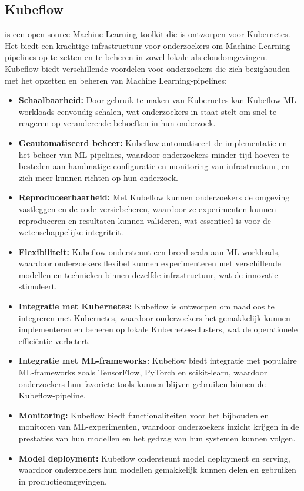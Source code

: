 \subsection{Kubeflow}
\autocite{Kubeflow2021} is een open-source Machine Learning-toolkit die is ontworpen voor Kubernetes. Het biedt een krachtige infrastructuur voor onderzoekers om Machine Learning-pipelines op te zetten en te beheren in zowel lokale als cloudomgevingen.
Kubeflow biedt verschillende voordelen voor onderzoekers die zich bezighouden met het opzetten en beheren van Machine Learning-pipelines:
\begin{itemize}
    \item \textbf{Schaalbaarheid:} Door gebruik te maken van Kubernetes kan Kubeflow ML-workloads eenvoudig schalen, wat onderzoekers in staat stelt om snel te reageren op veranderende behoeften in hun onderzoek.
    \item \textbf{Geautomatiseerd beheer:} Kubeflow automatiseert de implementatie en het beheer van ML-pipelines, waardoor onderzoekers minder tijd hoeven te besteden aan handmatige configuratie en monitoring van infrastructuur, en zich meer kunnen richten op hun onderzoek.
    \item \textbf{Reproduceerbaarheid:} Met Kubeflow kunnen onderzoekers de omgeving vastleggen en de code versiebeheren, waardoor ze experimenten kunnen reproduceren en resultaten kunnen valideren, wat essentieel is voor de wetenschappelijke integriteit.
    \item \textbf{Flexibiliteit:} Kubeflow ondersteunt een breed scala aan ML-workloads, waardoor onderzoekers flexibel kunnen experimenteren met verschillende modellen en technieken binnen dezelfde infrastructuur, wat de innovatie stimuleert.
    \item \textbf{Integratie met Kubernetes:} Kubeflow is ontworpen om naadloos te integreren met Kubernetes, waardoor onderzoekers het gemakkelijk kunnen implementeren en beheren op lokale Kubernetes-clusters, wat de operationele efficiëntie verbetert.
    \item \textbf{Integratie met ML-frameworks:} Kubeflow biedt integratie met populaire ML-frameworks zoals TensorFlow, PyTorch en scikit-learn, waardoor onderzoekers hun favoriete tools kunnen blijven gebruiken binnen de Kubeflow-pipeline.
    \item \textbf{Monitoring:} Kubeflow biedt functionaliteiten voor het bijhouden en monitoren van ML-experimenten, waardoor onderzoekers inzicht krijgen in de prestaties van hun modellen en het gedrag van hun systemen kunnen volgen.
    \item \textbf{Model deployment:} Kubeflow ondersteunt model deployment en serving, waardoor onderzoekers hun modellen gemakkelijk kunnen delen en gebruiken in productieomgevingen.
\end{itemize}
